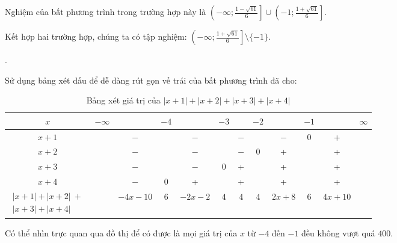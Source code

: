 Nghiệm của bất phương trình trong trường hợp này là $\left(-\infty; \frac{1 - \sqrt{61}}{6}\right] \cup \left(-1; \frac{1 + \sqrt{61}}{6}\right]$.

Kết hợp hai trường hợp, chúng ta có tập nghiệm: $\left(-\infty; \frac{1 + \sqrt{61}}{6}\right] \setminus \{-1\}$.

. 

Sử dụng bảng xét dấu để dễ dàng rút gọn vế trái của bất phương trình đã cho:
\begin{table}[H]
   \centering
   \begin{tabular}{|c|ccccccccccc|}
   \hline
   $x$                    & $-\infty$ &     & $-4$ &     & $-3$ &     & $-2$ &     & $-1$ &   & $\infty$ \\
   \hline
   $x+1$                  &           & $-$ &      & $-$ &      & $-$ &      & $-$ &  0   & + &           \\
   \hline
   $x+2$                  &           & $-$ &      & $-$ &      & $-$ &  0   &  +  &      & + &           \\
   \hline
   $x+3$                  &           & $-$ &      & $-$ &  0   &  +  &      &  +  &      & + &           \\
   \hline
   $x+4$                  &           & $-$ &  0   &  +  &      &  +  &      &  +  &      & + &           \\
   \hline
   $\begin{array}{l}
   |x + 1| + |x + 2|\ + \\
   |x + 3| + |x + 4|
   \end{array} $ &           &  $-4x - 10$  &  $6$  & $-2x - 2$ & $4$ & $4$ & $4$  & $2x + 8$ &  $6$  & $4x + 10$ &           \\
   \hline
   \end{tabular}
   \caption{Bảng xét giá trị của $|x + 1| + |x + 2| + |x + 3| + |x + 4|$}
\end{table}

Có thể nhìn trực quan qua đồ thị để có được là mọi giá trị của $x$ từ $-4$ đến $-1$ đều không vượt quá $400$.

